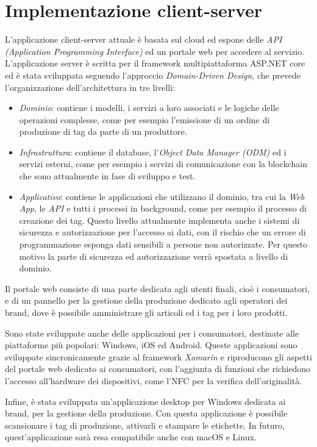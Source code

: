 \section{Implementazione client-server}
\label{implementazione-client-server}
L'applicazione client-server attuale è basata sul cloud ed espone delle \emph{API (Application Programming Interface)} ed un portale web per accedere al servizio. L'applicazione server è scritta per il framework multipiattaforma ASP.NET core ed è stata sviluppata seguendo l'approccio \emph{Domain-Driven Design}, che prevede l'organizzazione dell'architettura in tre livelli:
\begin{itemize}
    \item \emph{Dominio}: contiene i modelli, i servizi a loro associati e le logiche delle operazioni complesse, come per esempio l'emissione di un ordine di produzione di tag da parte di un produttore.
    \item \emph{Infrastruttura}: contiene il database, l'\emph{Object Data Manager (ODM)} ed i servizi esterni, come per esempio i servizi di comunicazione con la blockchain che sono attualmente in fase di sviluppo e test.
    \item \emph{Applicativo}: contiene le applicazioni che utilizzano il dominio, tra cui la \emph{Web App}, le \emph{API} e tutti i processi in background, come per esempio  il processo di creazione dei tag. Questo livello attualmente implementa anche i sistemi di sicurezza e autorizzazione per l'accesso ai dati, con il rischio che un errore di programmazione esponga dati sensibili a persone non autorizzate. Per questo motivo la parte di sicurezza ed autorizzazione verrà spostata a livello di dominio.
\end{itemize}

Il portale web consiste di una parte dedicata agli utenti finali, cioè i consumatori, e di un pannello per la gestione della produzione dedicato agli operatori dei brand, dove è possibile amministrare gli articoli ed i tag per i loro prodotti.

Sono state sviluppate anche delle applicazioni per i consumatori, destinate alle piattaforme più popolari: Windows, iOS ed Android. Queste applicazioni sono sviluppate sincronicamente grazie al framework \emph{Xamarin} e riproducono gli aspetti del portale web dedicato ai consumatori, con l'aggiunta di funzioni che richiedono l'accesso all'hardware dei dispositivi, come l'NFC per la verifica dell'originalità.

Infine, è stata sviluppata un'applicazione desktop per Windows dedicata ai brand, per la gestione della produzione. Con questa applicazione è possibile scansionare i tag di produzione, attivarli e stampare le etichette. In futuro, quest'applicazione sarà resa compatibile anche con macOS e Linux.

